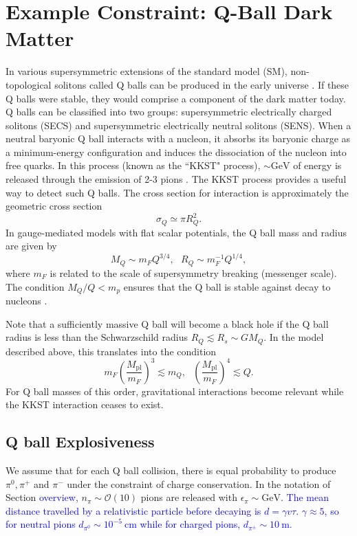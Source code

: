 \documentclass[11 pt,preprint,preprintnumbers,amsmath,amssymb, prd]{revtex4}
\newcommand{\OO}{\mathcal{O}}
\newcommand{\Mpl}{M_{\text{pl}}}
\def\r{\right)}
\def\l{\left(}
\begin{document}
\section{Example Constraint: Q-Ball Dark Matter}
In various supersymmetric extensions of the standard model (SM), non-topological solitons called Q balls can be produced in the early universe \cite{Coleman:1985ki, Kusenko:1997si}. If these Q balls were stable, they would comprise a component of the dark matter today. Q balls can be classified into two groups: supersymmetric electrically charged solitons (SECS) and supersymmetric electrically neutral solitons (SENS). When a neutral baryonic Q ball interacts with a nucleon, it absorbs its baryonic charge as a minimum-energy configuration and induces the dissociation of the nucleon into free quarks. In this process (known as the ``KKST" process), $\sim \text{GeV}$ of energy is released through the emission of 2-3 pions \cite{Dine:2003ax}. The KKST process provides a useful way to detect such Q balls. The cross section for interaction is approximately the geometric cross section
\begin{equation}
\sigma_Q \simeq \pi R_Q^2.
\end{equation}
In gauge-mediated models with flat scalar potentials, the Q ball mass and radius are given by
\begin{equation}
M_Q \sim m_F Q^{3/4}, ~~~ R_Q \sim m_F^{-1} Q^{1/4},
\end{equation}
where $m_F$ is related to the scale of supersymmetry breaking (messenger scale). The condition $M_Q/Q < m_p$ ensures that the Q ball is stable against decay to nucleons \cite{Dine:2003ax}.

Note that a sufficiently massive Q ball will become a black hole if the Q ball radius is less than the Schwarzschild radius $R_Q \lesssim R_s \sim G M_Q$. In the model described above, this translates into the condition
\begin{equation}
m_F \l\frac{\Mpl}{m_F}\r^3 \lesssim m_Q, ~~~ \l\frac{\Mpl}{m_F}\r^4 \lesssim Q.
\end{equation}
For Q ball masses of this order, gravitational interactions become relevant while the KKST interaction ceases to exist.

\subsection{Q ball Explosiveness}
We assume that for each Q ball collision, there is equal probability to produce $\pi^0, \pi^+$ and $\pi^-$ under the constraint of charge conservation. In the notation of Section \textcolor{blue}{overview}, $n_{\pi} \sim \OO(10)$ pions are released with $\epsilon_{\pi} \sim \text{GeV}$. \textcolor{blue}{The mean distance travelled by a relativistic particle before decaying is $d = \gamma v \tau$. $\gamma \approx 5$, so for neutral pions $d_{\pi^0} \sim 10^{-5} ~\text{cm}$ while for charged pions, $d_{\pi^\pm} \sim 10 ~\text{m}$.}
\end{document}
